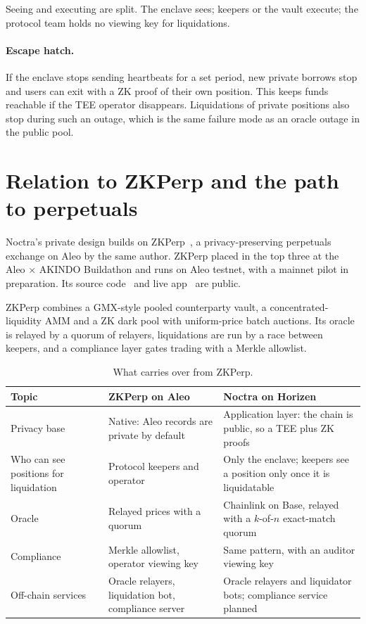 \documentclass[11pt,a4paper]{article}
\begin{document}
Seeing and executing are split. The enclave sees; keepers or the vault execute; the protocol team holds no
viewing key for liquidations.

\paragraph{Escape hatch.} If the enclave stops sending heartbeats for a set period, new private borrows stop and users can exit with a ZK
proof of their own position. This keeps funds reachable if the TEE operator disappears. Liquidations of private
positions also stop during such an outage, which is the same failure mode as an oracle outage in the public
pool.

\section{Relation to ZKPerp and the path to perpetuals}
\label{sec:zkperp}

Noctra's private design builds on ZKPerp~\citep{zkperp}, a privacy-preserving perpetuals exchange on Aleo by the
same author. ZKPerp placed in the top three at the Aleo $\times$ AKINDO Buildathon and runs on Aleo testnet,
with a mainnet pilot in preparation. Its source code~\citep{zkperpcode} and live app~\citep{zkperpapp} are
public.

ZKPerp combines a GMX-style pooled counterparty vault, a concentrated-liquidity AMM and a ZK dark pool with
uniform-price batch auctions. Its oracle is relayed by a quorum of relayers, liquidations are run by a race
between keepers, and a compliance layer gates trading with a Merkle allowlist.

\begin{table}[h]
\centering
\caption{What carries over from ZKPerp.}
\begin{tabularx}{\textwidth}{@{}p{3.2cm}LL@{}}
\toprule
Topic & ZKPerp on Aleo & Noctra on Horizen \\
\midrule
Privacy base & Native: Aleo records are private by default & Application layer: the chain is public, so a TEE
  plus ZK proofs \\
Who can see positions for liquidation & Protocol keepers and operator & Only the enclave; keepers see a
  position only once it is liquidatable \\
Oracle & Relayed prices with a quorum & Chainlink on Base, relayed with a $k$-of-$n$ exact-match quorum \\
Compliance & Merkle allowlist, operator viewing key & Same pattern, with an auditor viewing key \\
Off-chain services & Oracle relayers, liquidation bot, compliance server & Oracle relayers and liquidator bots;
  compliance service planned \\
\bottomrule
\end{tabularx}
\end{table}
\end{document}
